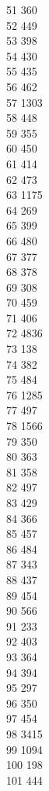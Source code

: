 { 51	360 \\
 52	449 \\
 53	398 \\
 54	430 \\
 55	435 \\
 56	462 \\
 57	1303 \\
 58	448 \\
 59	355 \\
 60	450 \\
 61	414 \\
 62	473 \\
 63	1175 \\
 64	269 \\
 65	399 \\
 66	480 \\
 67	377 \\
 68	378 \\
 69	308 \\
 70	459 \\
 71	406 \\
 72	4836 \\
 73	138 \\
 74	382 \\
 75	484 \\
 76	1285 \\
 77	497 \\
 78	1566 \\
 79	350 \\
 80	363 \\
 81	358 \\
 82	497 \\
 83	429 \\
 84	366 \\
 85	457 \\
 86	484 \\
 87	343 \\
 88	437 \\
 89	454 \\
 90	566 \\
 91	233 \\
 92	403 \\
 93	364 \\
 94	394 \\
 95	297 \\
 96	350 \\
 97	454 \\
 98	3415 \\
 99	1094 \\
 100	198 \\
 101	444 \\
}
